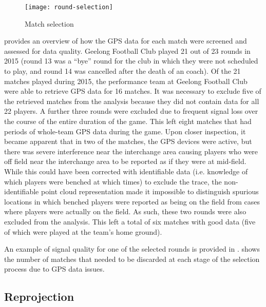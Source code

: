 \begin{figure}[!htb]
  \centering
  \texttt{[image: round-selection]}
  \caption{Match selection}
  \label{fig:prisma-round-selection}
\end{figure}

 provides an overview of how the GPS data for each match were screened and assessed for data quality. Geelong Football Club played 21 out of 23 rounds in 2015 (round 13 was a ``bye'' round for the club in which they were not scheduled to play, and
round 14 was cancelled after the death of an \afl{} coach).
Of the 21 matches played during 2015, the performance team at Geelong Football Club were able to retrieve GPS data for 16 matches. It was necessary to exclude five of the retrieved matches from the analysis because they did not contain data for all 22 players. A further three rounds were excluded due to frequent signal loss over the course of the entire duration of the game. This left eight matches that had periods of whole-team GPS data during the game. Upon closer inspection, it became apparent that in two of the matches, the GPS devices were active, but there was severe interference near the interchange area causing players who were off field near the interchange area to be reported as if they were at mid-field. While this could have been corrected with identifiable data (i.e. knowledge of which players were benched at which times) to exclude the trace, the non-identifiable point cloud representation made it impossible to distinguish spurious locations in which benched players were reported as being on the field from cases where players were actually on the field. As such, these two rounds were also excluded from the analysis. This left a total of six matches with good data (five of which were played at the team's home ground).

An example of signal quality for one of the selected rounds is provided in .  shows the number of matches that needed to be discarded at each stage of the selection process due to GPS data issues.



\subsection{Reprojection} \label{sec:integration-reprojection}

